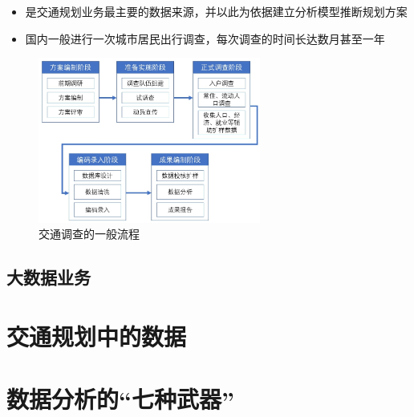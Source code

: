 \documentclass{beamerthemeMono}
\begin{document}
\begin{frame}[t]{\subsecname}
\begin{itemize}
\item {}是交通规划业务最主要的数据来源，并以此为依据建立分析模型推断规划方案
\item 国内一般进行一次城市居民出行调查，每次调查的时间长达数月甚至一年
\end{itemize}

\begin{figure}
  \centering
  \includegraphics[width=0.65\textwidth]{chp01_交通调查.jpg}
  \caption{交通调查的一般流程}
\end{figure}
\end{frame}

\subsection{大数据业务}
\begin{frame}[t]{\subsecname}

\end{frame}


\section{交通规划中的数据}


\section{数据分析的``七种武器''}

\end{document}

